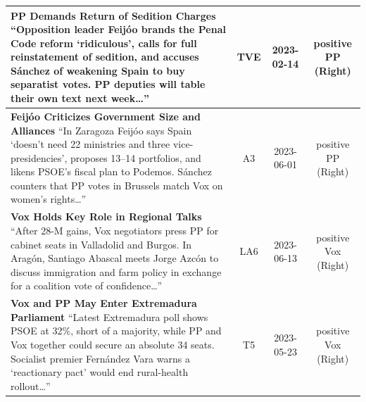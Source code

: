 \documentclass[12pt]{article}
\begin{document}
\begin{longtable}{|p{8cm}|c|c|c|}
\hline
\textbf{PP Demands Return of Sedition Charges}\newline
{\scriptsize
	“Opposition leader Feijóo brands the Penal Code reform ‘ridiculous’, calls for full reinstatement of sedition, and accuses Sánchez of weakening Spain to buy separatist votes.  
	PP deputies will table their own text next week…”}
& TVE & 2023-02-14 & positive PP (Right)\\
\hline
\textbf{Feijóo Criticizes Government Size and Alliances}\newline
{\scriptsize
	“In Zaragoza Feijóo says Spain ‘doesn’t need 22 ministries and three vice-presidencies’, proposes 13–14 portfolios, and likens PSOE’s fiscal plan to Podemos.  
	Sánchez counters that PP votes in Brussels match Vox on women’s rights…”}
& A3 & 2023-06-01 & positive PP (Right)\\
\hline
\textbf{Vox Holds Key Role in Regional Talks}\newline
{\scriptsize
	“After 28-M gains, Vox negotiators press PP for cabinet seats in Valladolid and Burgos.  
	In Aragón, Santiago Abascal meets Jorge Azcón to discuss immigration and farm policy in exchange for a coalition vote of confidence…”}
& LA6 & 2023-06-13 & positive Vox (Right)\\
\hline
\textbf{Vox and PP May Enter Extremadura Parliament}\newline
{\scriptsize
	“Latest Extremadura poll shows PSOE at 32\%, short of a majority, while PP and Vox together could secure an absolute 34 seats.  
	Socialist premier Fernández Vara warns a ‘reactionary pact’ would end rural-health rollout…”}
& T5 & 2023-05-23 & positive Vox (Right)\\

\end{longtable}
\end{document}
